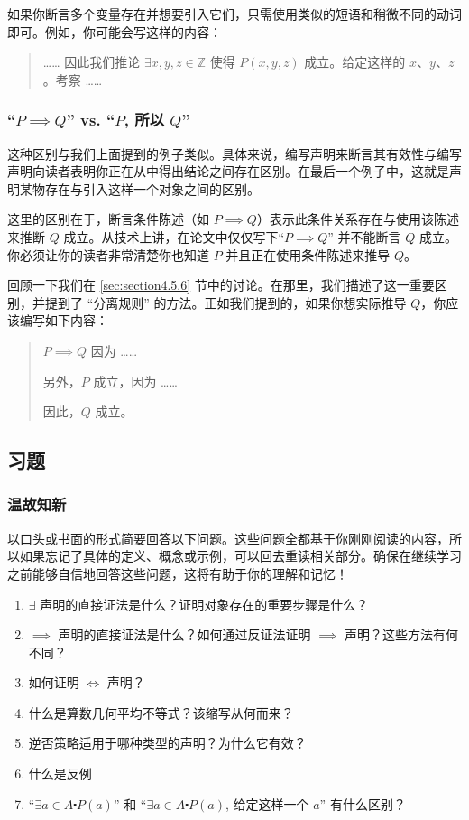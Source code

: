 如果你断言多个变量存在并想要引入它们，只需使用类似的短语和稍微不同的动词即可。例如，你可能会写这样的内容：
\begin{quote}
    …… 因此我们推论 $\exists x, y, z \in \mathbb{Z}$ 使得 $P(x, y, z)$ 成立。给定这样的 $x、y、z$。考察 ……
\end{quote}

\subsubsection*{``$P \implies Q$'' vs. ``$P$, 所以 $Q$''}

这种区别与我们上面提到的例子类似。具体来说，编写声明来断言其有效性与编写声明向读者表明你正在从中得出结论之间存在区别。在最后一个例子中，这就是声明某物存在与引入这样一个对象之间的区别。

这里的区别在于，断言条件陈述（如 $P \implies Q$）表示此条件关系存在与使用该陈述来推断 $Q$ 成立。从技术上讲，在论文中仅仅写下``$P \implies Q$'' 并不能断言 $Q$ 成立。你必须让你的读者非常清楚你也知道 $P$ 并且正在使用条件陈述来推导 $Q$。

回顾一下我们在 \ref{sec:section4.5.6} 节中的讨论。在那里，我们描述了这一重要区别，并提到了 ``分离规则'' 的方法。正如我们提到的，如果你想实际推导 $Q$，你应该编写如下内容：
\begin{quote}
    $P \implies Q$ 因为 ……

    另外，$P$ 成立，因为 ……

    因此，$Q$ 成立。
\end{quote}

\subsection{习题}\label{sec:section4.9.9}

\subsubsection*{温故知新}

以口头或书面的形式简要回答以下问题。这些问题全都基于你刚刚阅读的内容，所以如果忘记了具体的定义、概念或示例，可以回去重读相关部分。确保在继续学习之前能够自信地回答这些问题，这将有助于你的理解和记忆！

\begin{enumerate}[label=(\arabic*)]
    \item $\exists$ 声明的直接证法是什么？证明对象存在的重要步骤是什么？
    \item $\implies$ 声明的直接证法是什么？如何通过反证法证明 $\implies$ 声明？这些方法有何不同？
    \item 如何证明 $\iff$ 声明？
    \item 什么是算数几何平均不等式？该缩写从何而来？
    \item 逆否策略适用于哪种类型的声明？为什么它有效？
    \item 什么是反例
    \item ``$\exists a \in A \centerdot P(a)$'' 和 ``$\exists a \in A \centerdot P(a)$, 给定这样一个 $a$'' 有什么区别？
\end{enumerate}

